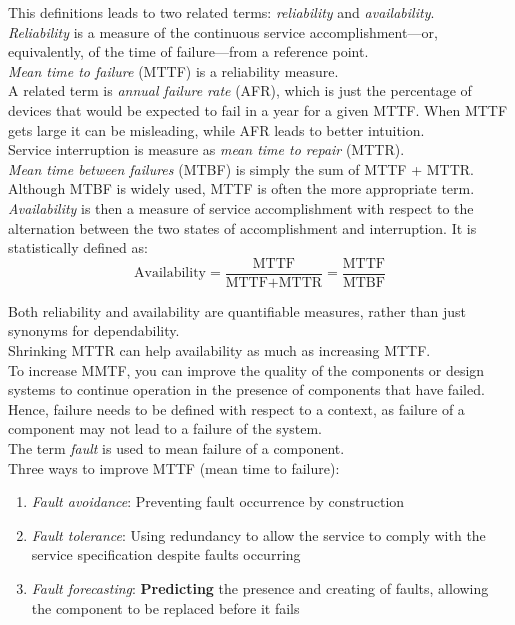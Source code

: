 \documentclass[12pt]{article}
\theoremstyle{definition}
\begin{document}
  This definitions leads to two related terms: \emph{reliability} and \emph{availability}. \\

  \emph{Reliability} is a measure of the continuous service accomplishment---or, equivalently, of the time of failure---from a reference point.\\
  \emph{Mean time to failure} (MTTF) is a reliability measure. \\
  A related term is \emph{annual failure rate} (AFR), which is just the percentage of devices that would be expected to fail in a year for a given MTTF.
  When MTTF gets large it can be misleading, while AFR leads to better intuition. \\
  Service interruption is measure as \emph{mean time to repair} (MTTR). \\
  \emph{Mean time between failures} (MTBF) is simply the sum of MTTF + MTTR.
  Although MTBF is widely used, MTTF is often the more appropriate term. \\

  \emph{Availability} is then a measure of service accomplishment with respect to the alternation between the two states of accomplishment and interruption.
  It is statistically defined as:
  $$\text{Availability} = \frac{\text{MTTF}}{\text{MTTF} + \text{MTTR}} = \frac{\text{MTTF}}{\text{MTBF}}$$

  Both reliability and availability are quantifiable measures, rather than just synonyms for dependability. \\
  Shrinking MTTR can help availability as much as increasing MTTF. \\

  To increase MMTF, you can improve the quality of the components or design systems to continue operation in the presence of components that have failed.
  Hence, failure needs to be defined with respect to a context, as failure of a component may not lead to a failure of the system. \\
  The term \emph{fault} is used to mean failure of a component. \\
  Three ways to improve MTTF (mean time to failure):
  \begin{enumerate}
    \item \emph{Fault avoidance}: Preventing fault occurrence by construction
    \item \emph{Fault tolerance}: Using redundancy to allow the service to comply with the service specification despite faults occurring
    \item \emph{Fault forecasting}: \textbf{Predicting} the presence and creating of faults, allowing the component to be replaced before it fails
  \end{enumerate}
\end{document}
